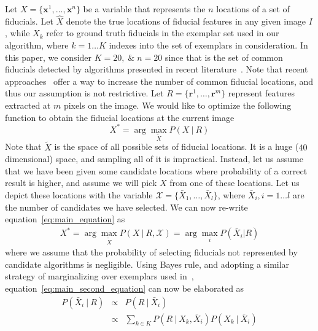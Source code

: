 \label{subsec:formulation}
Let $X = \{ \mathbf{x}^1, \ldots, \mathbf{x}^n \}$ be a variable that represents the $n$ locations of 
a set of fiducials.
Let $\hat{X}$ denote the true locations of fiducial features in any given image $I$, while $X_k$ refer
to ground truth fiducials in the exemplar set used in our algorithm, where $k = 1 \ldots K $ indexes
into the set of exemplars in consideration. In this paper, we consider $K = 20, \; \& \; n = 20$
since that is the set of common fiducials detected by algorithms presented in recent
literature~\cite{xhuCVPR12_wild,xiongCVPR13_SDM,artizzzuICCV13_COFW,asthanaCVPR14_Chehra,Tzimiropoulos_2015_CVPR}. Note that
recent approaches~\cite{smithECCV14_ED} offer a way to increase the number of common fiducial
locations, and thus our assumption is not restrictive.
Let $R = \{ \mathbf{r}^1, \ldots, \mathbf{r}^m \}$ represent features extracted at $m$ pixels on the
image. We would like to optimize the following function to obtain the fiducial locations at the
current image 
\begin{equation}
  X^* = \arg\max_{\tilde{X}} P( X~|~R )
  \label{eq:main_equation}
\end{equation}
Note that $\tilde{X}$ is the space of all possible sets of fiducial locations. It is a huge
($40$ dimensional) space, and sampling all of it is impractical. Instead, let us assume that we have
been given some candidate locations where probability of a correct result is higher, and assume we
will pick $X$ from one of these locations. Let us depict
these locations with the variable $\mathcal{X} = \{\bar{X}_1, \ldots, \bar{X}_l \}$, where $\bar{X}_i,
i = 1\ldots l$ are the number of candidates we have selected. We can now re-write equation~\ref{eq:main_equation} as
\begin{eqnarray}
  X^* = \arg\max_{\tilde{X}} P( X~|~R, \mathcal{X} )  = \arg\max_i P(\bar{X}_i | R ) 
  \label{eq:main_second_equation}
\end{eqnarray}
where we assume that the probability of selecting fiducials not represented by candidate algorithms
is negligible. Using Bayes rule, and adopting a similar strategy of marginalizing over exemplars used
in~\cite{kumarPAMI13_faceExem}, equation~\ref{eq:main_second_equation} can now be
elaborated as
\begin{eqnarray}
  P( \bar{X}_i~|~R ) & \propto & P( R~|~\bar{X}_i ) \\
  & \propto & \sum_{k\in K} P( R~|~X_k, \bar{X}_i) P( X_k~|~\bar{X}_i )
  \label{eq:main_third_equation}
\end{eqnarray}
